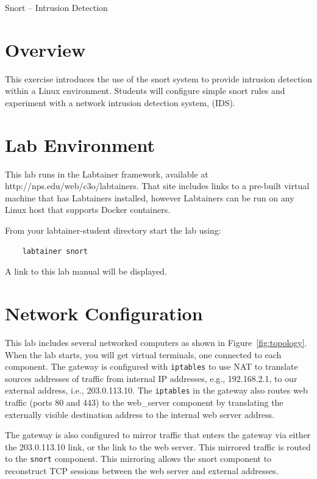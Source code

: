 


\begin{center}
{\LARGE Snort -- Intrusion Detection}
\vspace{0.1in}\\
\end{center}

\copyrightnotice

\section{Overview}
This exercise introduces the use of the snort system
to provide intrusion detection within a
Linux environment.  Students will configure simple 
snort rules and experiment with a network 
intrusion detection system, (IDS).  


\section{Lab Environment}
This lab runs in the Labtainer framework,
available at http://nps.edu/web/c3o/labtainers.
That site includes links to a pre-built virtual machine
that has Labtainers installed, however Labtainers can
be run on any Linux host that supports Docker containers.

From your labtainer-student directory start the lab using:
\begin{verbatim}
    labtainer snort
\end{verbatim}
\noindent A link to this lab manual will be displayed.  

\section{Network Configuration}
This lab includes several networked computers as shown in Figure~\ref{fig:topology}.
When the lab starts, you will get virtual terminals, one connected to each
component.  The gateway is configured with {\tt iptables} to use NAT to translate
sources addresses of traffic from internal IP addresses, e.g., 192.168.2.1, to
our external address, i.e., 203.0.113.10.  The {\tt iptables} in the gateway also
routes web traffic (ports 80 and 443) to the web\_server component by translating
the externally visible destination address to the internal web server address.

The gateway is also configured to mirror traffic that enters the gateway 
via either the 203.0.113.10 link, or the link to the web server.  This
mirrored traffic is routed to the {\tt snort} component.  This mirroring allows
the snort component to reconstruct TCP sessions between the web server and external
addresses.

